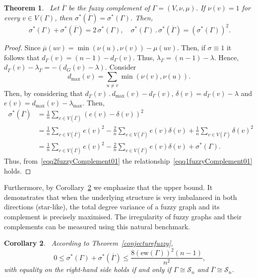 \documentclass[12pt]{amsart}
\newtheorem{theorem}{Theorem}[section]
\newtheorem{corollary}[theorem]{Corollary}
\newcommand{\ew}{\mathrm{ew}}
\newcommand{\SF}{\sigma^*}
\newcommand{\SFG}{\sigma^*(\Gamma)}
\newcommand{\OG}{\overline{\Gamma}}
\begin{document}
\begin{theorem}~\label{fuzzyComplement01}
Let $\overline{\Gamma}$ be the fuzzy complement of $\Gamma=(V,\nu,\mu)$. If $\nu(v)=1$ for every $v\in V(\Gamma)$, then $\SF(\OG)=\SFG$. Then, 
\begin{equation}~\label{eqq1fuzzyComplement01}
 \SFG+\SF(\OG)=2\,\SFG, \quad     \SFG\,.\,\SF(\OG)=(\SFG)^2.
\end{equation}
\end{theorem}
\begin{proof}
Since $\overline{\mu}(uv)=\min(\nu(u),\nu(v))-\mu(uv)$. Then, if $\sigma\equiv1$ it follows that $d_{\OG}(v)=(n-1)-d_\Gamma(v)$. Thus, $\lambda_{\OG}=(n-1)-\lambda$. Hence, $d_{\OG}(v)-\lambda_{\OG}=-(d_G(v)-\lambda).$ Consider $$d_{\max}(v)=\sum_{u\neq v}\min(\nu(v),\nu(u)).$$ 
Then, by considering that $d_{\OG}(v)\,.\,d_{\max}(v)-d_\Gamma(v)$, $\delta(v)=d_\Gamma(v)-\lambda$ and $e(v)=d_{\max}(v)-\lambda_{\max}$. Then, 
\begin{equation}~\label{eqq2fuzzyComplement01}
\begin{aligned}
\SF(\OG)&=\frac{1}{n}\sum_{v\in V(\OG)}(e(v)-\delta(v))^2\\
&=\frac{1}{n}\sum_{v\in V(\OG)}e(v)^2-\frac{2}{n}\sum_{v\in V(\OG)}e(v)\delta(v)+\frac{1}{n}\sum_{v\in V(\OG)}\delta(v)^2\\
&=\frac{1}{n}\sum_{v\in V(\OG)}e(v)^2-\frac{2}{n}\sum_{v\in V(\OG)}e(v)\delta(v)+\SFG.
\end{aligned}
\end{equation}
Thus, from~\eqref{eqq2fuzzyComplement01} the relationship~\eqref{eqq1fuzzyComplement01} holds.  
\end{proof}
Furthermore, by Corollary~\ref{fuzzycorollary01} we emphasize that the upper bound. It demonstrates that when the underlying structure is very imbalanced in both directions (star-like), the total degree variance of a fuzzy graph and its complement is precisely maximised. The irregularity of fuzzy graphs and their complements can be measured using this natural benchmark.

\begin{corollary}~\label{fuzzycorollary01}
According to Theorem~\ref{conjecturefuzzy}, 
\begin{equation}~\label{eqq1fuzzycorollary01}
0\leq \SFG+\SF(\OG)\leqslant \frac{8(\ew(\Gamma))^2(n-1)}{n^2}, 
\end{equation}
with equality on the right-hand side holds if and only if $\Gamma\cong \mathcal{S}_n$ and $\OG\cong \mathcal{S}_n$.
\end{corollary}
\end{document}
